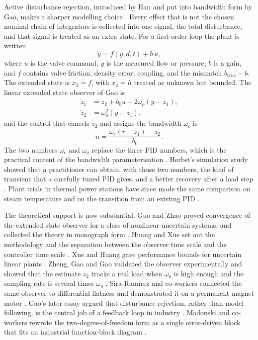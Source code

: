 Active disturbance rejection, introduced by Han and put into bandwidth form by Gao, makes a sharper modelling choice \cite{han1998adrc,han2008book,han2009pid,gao2003scaling,gao2006paradigm}. Every effect that is not the chosen nominal chain of integrators is collected into one signal, the total disturbance, and that signal is treated as an extra state. For a first-order loop the plant is written
\begin{equation}
\label{eq:first-order-total}
\dot{y} = f(y,d,t) + b\, u,
\end{equation}
where $u$ is the valve command, $y$ is the measured flow or pressure, $b$ is a gain, and $f$ contains valve friction, density error, coupling, and the mismatch $b_{\mathrm{true}}-b$. The extended state is $x_2=f$, with $\dot{x}_2=h$ treated as unknown but bounded. The linear extended state observer of Gao is
\begin{align}
\dot{z}_1 &= z_2 + b_0 u + 2\omega_o (y-z_1), \label{eq:leso1}\\
\dot{z}_2 &= \omega_o^2 (y-z_1), \label{eq:leso2}
\end{align}
and the control that cancels $z_2$ and assigns the bandwidth $\omega_c$ is
\begin{equation}
\label{eq:ladrc-u}
u = \frac{\omega_c(r-z_1) - z_2}{b_0}.
\end{equation}
The two numbers $\omega_c$ and $\omega_o$ replace the three PID numbers, which is the practical content of the bandwidth parameterisation \cite{gao2003scaling}. Herbst's simulation study showed that a practitioner can obtain, with those two numbers, the kind of transient that a carefully tuned PID gives, and a better recovery after a load step \cite{herbst2013simulative}. Plant trials in thermal power stations have since made the same comparison on steam temperature and on the transition from an existing PID \cite{sun2016tuning,wu2021transition}.

The theoretical support is now substantial. Guo and Zhao proved convergence of the extended state observer for a class of nonlinear uncertain systems, and collected the theory in monograph form \cite{guo2011convergence,guo2016book}. Huang and Xue set out the methodology and the separation between the observer time scale and the controller time scale \cite{huang2014methodology}. Xue and Huang gave performance bounds for uncertain linear plants \cite{xue2015performance}. Zheng, Gao and Gao validated the observer experimentally and showed that the estimate $z_2$ tracks a real load when $\omega_o$ is high enough and the sampling rate is several times $\omega_o$ \cite{zheng2012validation}. Sira-Ram\'irez and co-workers connected the same observer to differential flatness and demonstrated it on a permanent-magnet motor \cite{sira2017adrc,sira2014pmsm}. Gao's later essay argued that disturbance rejection, rather than model following, is the central job of a feedback loop in industry \cite{gao2014centrality}. Madonski and co-workers rewrote the two-degree-of-freedom form as a single error-driven block that fits an industrial function-block diagram \cite{madonski2019error}.

